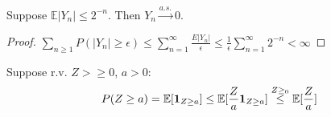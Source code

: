 \documentclass[11pt]{article}
\begin{document}
\begin{example}
    Suppose $\mathbb{E}|Y_n| \le 2^{-n}$. Then $Y_n \xrightarrow{a.s.}0$.
    \begin{proof}
        $\sum_{n\ge 1}P(|Y_n|\ge \epsilon) \le \sum_{n=1}^{\infty}\frac{E|Y_n|}{\epsilon}
        \le \frac{1}{\epsilon} \sum_{n=1}^{\infty}2^{-n} < \infty$
    \end{proof}
\end{example}
\begin{remark}
    Suppose r.v. $Z > \ge 0$, $a>0$:
    \begin{align*}
        P(Z \ge a) = \mathbb{E}[\bm{1}_{Z\ge a}]\le \mathbb{E}[\frac{Z}{a}\bm{1}_{Z\ge a}] \overset{Z\ge_0}{\le}
        \mathbb{E}[\frac{Z}{a}] 
    \end{align*}
\end{remark}
\end{document}
